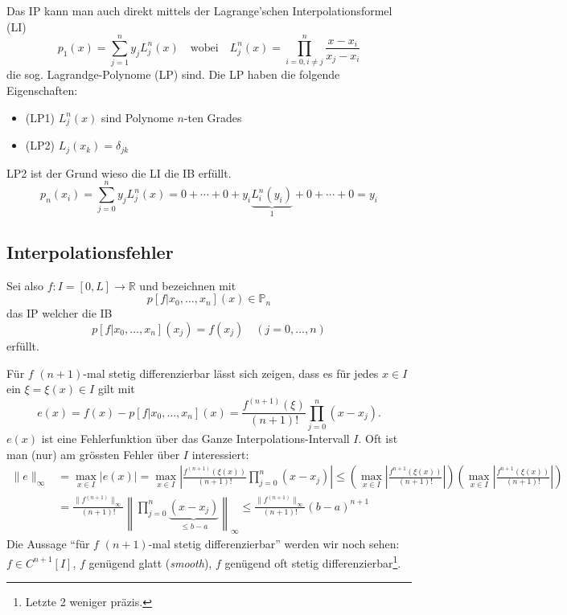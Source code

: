 \documentclass[a4paper]{article}
\begin{document}
Das IP kann man auch direkt mittels der Lagrange'schen Interpolationsformel
(LI)
\[
  p_1(x) = \sum_{j=1}^n y_j L_j^n(x)
  \quad\text{wobei}\quad
  L_j^n(x) = \prod_{i=0, i\neq j}^n \frac{x - x_i}{x_j - x_i}
\]
die sog. Lagrandge-Polynome (LP) sind. Die LP haben die folgende
Eigenschaften:
\begin{itemize}
  \item (LP1) $L_j^n(x)$ sind Polynome $n$-ten Grades
  \item (LP2) $L_j(x_k) = \delta_{jk}$
\end{itemize}
LP2 ist der Grund wieso die LI die IB erfüllt.
\[
  p_n(x_i) = \sum_{j=0}^n y_j L_j^n(x)
    = 0 + \cdots + 0 + y_i \underbrace{L_i^n(y_i)}_1 + 0 + \cdots + 0
    = y_i
\]

\subsection{Interpolationsfehler}

Sei also $f: I = [0,L] \to \mathbb{R}$ und bezeichnen mit
\[
  p[f | x_0, \ldots, x_n ] (x) \in \mathbb{P}_n
\]
das IP welcher die IB
\[
  p[f | x_0, \ldots, x_n ] (x_j) = f(x_j) \quad (j = 0, \ldots, n)
\]
erfüllt.
\begin{center}
  \skelfig
\end{center}
Für $f$ $(n+1)$-mal stetig differenzierbar lässt sich zeigen, dass es für
jedes $x \in I$ ein $\xi = \xi(x) \in I$ gilt mit
\[
  e(x) = f(x) - p[f | x_0, \ldots, x_n ] (x)
       = \frac{f^{(n+1)}(\xi)}{(n+1)!} \prod_{j=0}^n (x - x_j).
\]
$e(x)$ ist eine Fehlerfunktion über das Ganze Interpolations-Intervall $I$.
Oft ist man (nur) am grössten Fehler über $I$ interessiert:
\begin{align*}
  \|e\|_\infty &= \max_{x \in I} |e(x)|
    = \max_{x \in I} \left|
      \frac{f^{(n+1)}(\xi(x))}{(n+1)!} \prod_{j=0}^n (x - x_j)
    \right|
    \leq \left(
      \max_{x \in I} \left| \frac{f^{n+1}(\xi(x))}{(n+1)!} \right|
    \right)\left(
      \max_{x \in I} \left| \frac{f^{n+1}(\xi(x))}{(n+1)!} \right|
    \right)
    \\
    &= \frac{\|f^{(n+1)}\|_\infty}{(n+1)!} \left\|
        \prod_{j=0}^n \underbrace{(x - x_j)}_{\leq b-a}
      \right\|_\infty
    \leq \frac{\|f^{(n+1)}\|_\infty}{(n+1)!} (b-a)^{n+1}
\end{align*}
Die Aussage ``für $f$ $(n+1)$-mal stetig differenzierbar'' werden wir noch
sehen: $f \in C^{n+1}[I]$, $f$ genügend glatt (\emph{smooth}), $f$ genügend
oft stetig differenzierbar\footnote{Letzte 2 weniger präzis.}.
\end{document}
